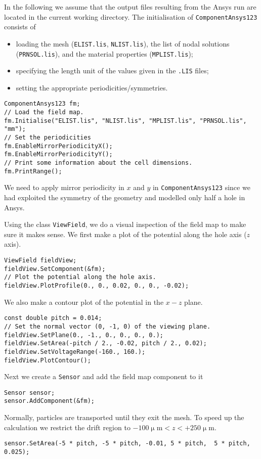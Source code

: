 In the following we assume that the output files resulting from the 
Ansys run are located in the current working directory.
The initialisation of \texttt{ComponentAnsys123} consists of 
\begin{itemize}
  \item
  loading the mesh (\texttt{ELIST.lis}, \texttt{NLIST.lis}), 
  the list of nodal solutions (\texttt{PRNSOL.lis}), and the 
  material properties (\texttt{MPLIST.lis});
  \item
  specifying the length unit of the values given in the 
  \texttt{.LIS} files;
  \item
  setting the appropriate periodicities/symmetries.
\end{itemize}
\begin{lstlisting}
ComponentAnsys123 fm;
// Load the field map.
fm.Initialise("ELIST.lis", "NLIST.lis", "MPLIST.lis", "PRNSOL.lis", "mm");
// Set the periodicities
fm.EnableMirrorPeriodicityX();
fm.EnableMirrorPeriodicityY();
// Print some information about the cell dimensions.
fm.PrintRange();
\end{lstlisting}
We need to apply mirror periodicity in $x$ and $y$
in \texttt{ComponentAnsys123} since we had exploited the symmetry 
of the geometry and modelled only half a hole in Ansys.

Using the class \texttt{ViewField}, we do a visual inspection of the 
field map to make sure it makes sense. 
We first make a plot of the potential along the hole axis ($z$ axis).
\begin{lstlisting}
ViewField fieldView;
fieldView.SetComponent(&fm);
// Plot the potential along the hole axis.
fieldView.PlotProfile(0., 0., 0.02, 0., 0., -0.02);
\end{lstlisting}
We also make a contour plot of the potential in the $x - z$ plane.
\begin{lstlisting}
const double pitch = 0.014;
// Set the normal vector (0, -1, 0) of the viewing plane.
fieldView.SetPlane(0., -1., 0., 0., 0., 0.);
fieldView.SetArea(-pitch / 2., -0.02, pitch / 2., 0.02);
fieldView.SetVoltageRange(-160., 160.);
fieldView.PlotContour();
\end{lstlisting}
Next we create a \texttt{Sensor} and add the field map 
component to it
\begin{lstlisting}
Sensor sensor;
sensor.AddComponent(&fm);
\end{lstlisting}
Normally, particles are transported until they exit the mesh. 
To speed up the calculation we restrict the drift region to 
$-100\upmu\text{m} < z < +250\upmu\text{m}$.
\begin{lstlisting}
sensor.SetArea(-5 * pitch, -5 * pitch, -0.01, 5 * pitch,  5 * pitch,  0.025);
\end{lstlisting}

